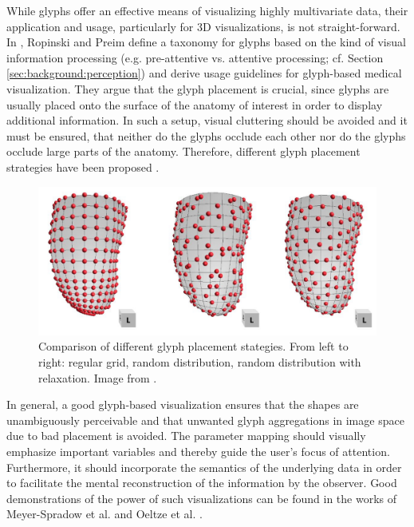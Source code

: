 While glyphs offer an effective means of visualizing highly multivariate data, their application and usage, particularly for 3D visualizations, is not straight-forward.
In \cite{Ropinski:2008:GlyphTaxonomy}, Ropinski and Preim define a taxonomy for glyphs based on the kind of visual information processing (e.g. pre-attentive vs. attentive processing; cf. Section \ref{sec:background:perception}) and derive usage guidelines for glyph-based medical visualization.
They argue that the glyph placement is crucial, since glyphs are usually placed onto the surface of the anatomy of interest in order to display additional information.
In such a setup, visual cluttering should be avoided and it must be ensured, that neither do the glyphs occlude each other nor do the glyphs occlude large parts of the anatomy.
Therefore, different glyph placement strategies have been proposed \cite{Ward:2002:GlyphPlacement}. 
\begin{figure}[ht]
	\centering
	\includegraphics[width=0.75\linewidth]{figures/background/glyph-placement.jpg}
	\caption{
		Comparison of different glyph placement stategies.
		From left to right: regular grid, random distribution, random distribution with relaxation.
		Image from \cite{MeyerSpradow:2008:GlyphVis}.
	}
	\label{fig:background:glyph-placement}
\end{figure}
In general, a good glyph-based visualization ensures that the shapes are unambiguously perceivable and that unwanted glyph aggregations in image space due to bad placement is avoided.
The parameter mapping should visually emphasize important variables and thereby guide the user's focus of attention.
Furthermore, it should incorporate the semantics of the underlying data in order to facilitate the mental reconstruction of the information by the observer.
Good demonstrations of the power of such visualizations can be found in the works of Meyer-Spradow et al. \cite{MeyerSpradow:2008:GlyphVis} and Oeltze et al. \cite{Oeltze:2008:GlyphVis}.


